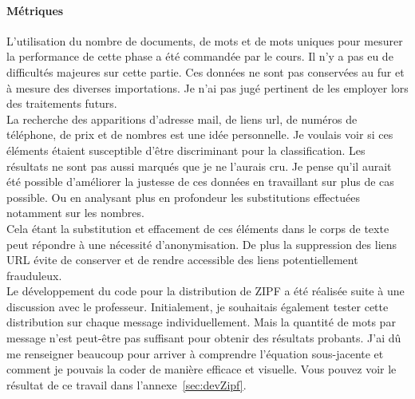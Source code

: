     \paragraph{Métriques}
        L'utilisation du nombre de documents, de mots et de mots uniques pour mesurer la performance de cette phase a été commandée par le cours.
        Il n'y a pas eu de difficultés majeures sur cette partie.
        Ces données ne sont pas conservées au fur et à mesure des diverses importations.
        Je n'ai pas jugé pertinent de les employer lors des traitements futurs. \\

        La recherche des apparitions d'adresse mail, de liens url, de numéros de téléphone, de prix et de nombres est une idée personnelle.
        Je voulais voir si ces éléments étaient susceptible d'être discriminant pour la classification.
        Les résultats ne sont pas aussi marqués que je ne l'aurais cru.
        Je pense qu'il aurait été possible d'améliorer la justesse de ces données en travaillant sur plus de cas possible.
        Ou en analysant plus en profondeur les substitutions effectuées notamment sur les nombres.\\
        Cela étant la substitution et effacement de ces éléments dans le corps de texte peut répondre à une nécessité d'anonymisation.
        De plus la suppression des liens URL évite de conserver et de rendre accessible des liens potentiellement frauduleux.\\

        Le développement du code pour la distribution de ZIPF a été réalisée suite à une discussion avec le professeur.
        Initialement, je souhaitais également tester cette distribution sur chaque message individuellement.
        Mais la quantité de mots par message n'est peut-être pas suffisant pour obtenir des résultats probants.
        J'ai dû me renseigner beaucoup pour arriver à comprendre l'équation sous-jacente et comment je pouvais la coder de manière efficace et visuelle.
        Vous pouvez voir le résultat de ce travail dans l'annexe~\ref{sec:devZipf}.

\newpage

